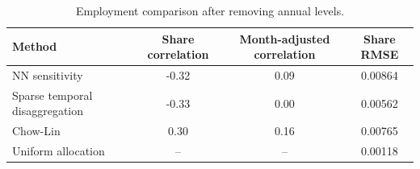 \begin{table}[!htb]
\centering
\caption{Employment comparison after removing annual levels.}
\label{tab:uniform_employment_validation}
\begin{tabular}{l c c c}
\toprule
Method & Share correlation & Month-adjusted correlation & Share RMSE \\
\midrule
NN sensitivity & -0.32 & 0.09 & 0.00864 \\
Sparse temporal disaggregation & -0.33 & 0.00 & 0.00562 \\
Chow-Lin & 0.30 & 0.16 & 0.00765 \\
Uniform allocation & -- & -- & 0.00118 \\
\bottomrule
\end{tabular}
\end{table}
